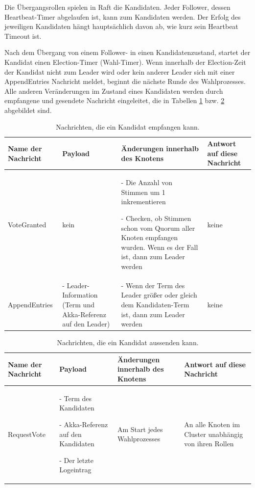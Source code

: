 Die Übergangsrollen spielen in Raft die Kandidaten. Jeder Follower, dessen Heartbeat-Timer abgelaufen ist, kann zum Kandidaten werden. Der Erfolg des jeweiligen Kandidaten hängt hauptsächlich davon ab, wie kurz sein Heartbeat Timeout ist.

Nach dem Übergang von einem Follower- in einen Kandidatenzustand, startet der Kandidat einen Election-Timer (Wahl-Timer). Wenn innerhalb der Election-Zeit der Kandidat nicht zum Leader wird oder kein anderer Leader sich mit einer AppendEntries Nachricht meldet, beginnt die nächste Runde des Wahlprozesses. Alle anderen Veränderungen im Zustand eines Kandidaten werden durch empfangene und gesendete Nachricht eingeleitet, die in Tabellen \ref{tab:candidateReceive} bzw. \ref{tab:candidateSend} abgebildet sind.

\begin{table} \centering
	\begin{tabular}{|p{2.5cm}|p{3.5cm}|p{3.5cm}|p{3.5cm}|} 
		\hline
		\textbf{Name der Nachricht} & \textbf{Payload} & \textbf{Änderungen innerhalb des Knotens} & \textbf{Antwort auf diese Nachricht}\\
		
		\hline
		VoteGranted & kein & - Die Anzahl von Stimmen um 1 inkrementieren
		
		- Checken, ob Stimmen schon vom Quorum aller Knoten empfangen wurden. Wenn es der Fall ist, dann zum Leader werden
		 & keine\\
		
		\hline
		AppendEntries & - Leader-Information (Term und Akka-Referenz auf den Leader) 
		& - Wenn der Term des Leader größer oder gleich dem Kandidaten-Term ist, dann zum Leader werden & keine\\
		
		\hline
	\end{tabular}
	\caption{Nachrichten, die ein Kandidat empfangen kann.}
	\label{tab:candidateReceive}
\end{table}

\begin{table} \centering
	\begin{tabular}{|p{2.5cm}|p{3.5cm}|p{3.5cm}|p{3.5cm}|} 
		\hline
		\textbf{Name der Nachricht} & \textbf{Payload} & \textbf{Änderungen innerhalb des Knotens} & \textbf{Antwort auf diese Nachricht}\\
		
		\hline
		RequestVote & - Term des Kandidaten
		
		- Akka-Referenz auf den Kandidaten
		
		- Der letzte Logeintrag
		 & Am Start jedes Wahlprozesses & An alle Knoten im Cluster unabhängig von ihren Rollen\\
		
		\hline
	\end{tabular}
	\caption{Nachrichten, die ein Kandidat aussenden kann.}
	\label{tab:candidateSend}
\end{table}

